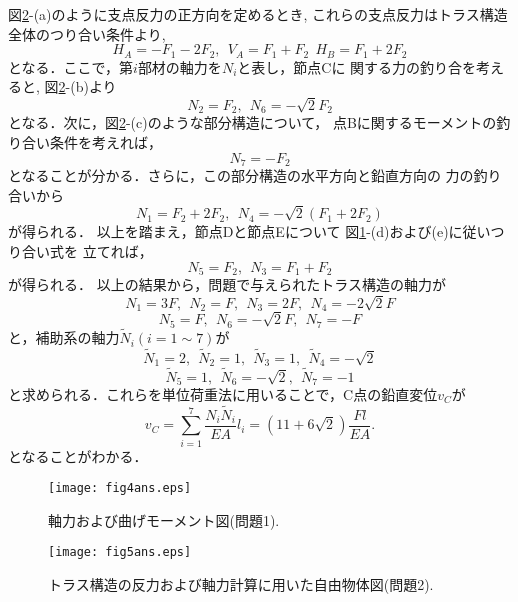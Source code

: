 \documentclass[10pt,a4j]{jarticle}
\begin{document}
図\ref{fig:fig5}-(a)のように支点反力の正方向を定めるとき, 
これらの支点反力はトラス構造全体のつり合い条件より, 
\[
	H_A=-F_1-2F_2, \ \ V_A=F_1+F_2
	\ \ H_B=F_1+2F_2
\]
となる．ここで，第$i$部材の軸力を$N_i$と表し，節点Cに
関する力の釣り合を考えると, 図\ref{fig:fig5}-(b)より
\[
	N_2=F_2, \ \ N_6=-\sqrt{2}F_2
\]
となる．次に，図\ref{fig:fig5}-(c)のような部分構造について，
点Bに関するモーメントの釣り合い条件を考えれば，
\[
	N_7=-F_2
\]
となることが分かる．さらに，この部分構造の水平方向と鉛直方向の
力の釣り合いから
\[
	N_1=F_2+2F_2, \ \ N_4=-\sqrt{2}\left( F_1+2F_2 \right)
\]
が得られる．
以上を踏まえ，節点Dと節点Eについて
図\ref{fig:fig4}-(d)および(e)に従いつり合い式を
立てれば，
\[
	N_5=F_2, \ \ N_3=F_1+F_2 
\]
が得られる．
以上の結果から，問題で与えられたトラス構造の軸力が
\[
	N_1=3F, \ \ N_2=F, \ \ N_3=2F, \ \ N_4=-2\sqrt{2}F
\]
\[
	N_5=F, \ \ N_6=-\sqrt{2}F, \ \ N_7=-F
\]
と，補助系の軸力$\tilde N_i (i=1\sim 7)$が
\[
	\tilde N_1=2, \ \ \tilde N_2=1, \ \ \tilde N_3=1, \ \ \tilde N_4=-\sqrt{2}
\]
\[
	\tilde N_5=1, \ \ \tilde N_6=-\sqrt{2}, \ \ \tilde N_7=-1
\]
と求められる．これらを単位荷重法に用いることで，C点の鉛直変位$v_C$が
\[
	v_C=\sum_{i=1}^7 \frac{N_i \tilde N_i}{EA}l_i =
	\left( 11+6\sqrt{2}\right)
	\frac{Fl}{EA}.
\]
となることがわかる．
\begin{figure}[h]
	\begin{center}
	\texttt{[image: fig4ans.eps]} 
	\end{center}
	\caption{軸力および曲げモーメント図(問題1).}
	\label{fig:fig4}
\end{figure}
\begin{figure}[h]
	\begin{center}
	\texttt{[image: fig5ans.eps]} 
	\end{center}
	\caption{トラス構造の反力および軸力計算に用いた自由物体図(問題2).}
	\label{fig:fig5}
\end{figure}
\end{document}
